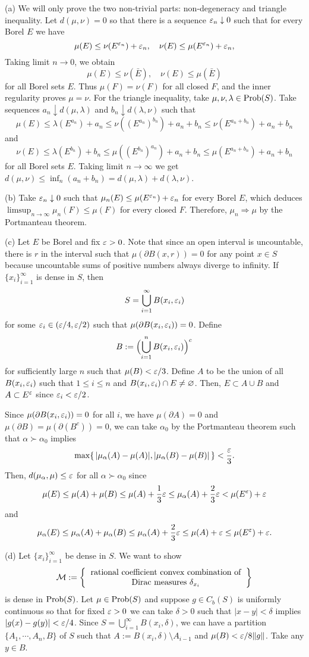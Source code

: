 \documentclass{../../small}
\begin{document}
\begin{pf}
(a)
We will only prove the two non-trivial parts: non-degeneracy and triangle inequality.
Let $d(\mu,\nu)=0$ so that there is a sequence $\varepsilon_n\downarrow0$ such that for every Borel $E$ we have
\[\mu(E)\le\nu(E^{\varepsilon_n})+\varepsilon_n,\quad\nu(E)\le\mu(E^{\varepsilon_n})+\varepsilon_n,\]
Taking limit $n\to0$, we obtain
\[\mu(E)\le\nu(\bar E),\quad\nu(E)\le\mu(\bar E)\]
for all Borel sets $E$.
Thus $\mu(F)=\nu(F)$ for all closed $F$, and the inner regularity proves $\mu=\nu$.
For the triangle inequality, take $\mu,\nu,\lambda\in\operatorname{Prob}(S)$.
Take sequences $a_n\downarrow d(\mu,\lambda)$ and $b_n\downarrow d(\lambda,\nu)$ such that
\[\mu(E)\le\lambda(E^{a_n})+a_n\le\nu((E^{a_n})^{b_n})+a_n+b_n\le\nu(E^{a_n+b_n})+a_n+b_n\]
and
\[\nu(E)\le\lambda(E^{b_n})+b_n\le\mu((E^{b_n})^{a_n})+a_n+b_n\le\mu(E^{a_n+b_n})+a_n+b_n\]
for all Borel sets $E$.
Taking limit $n\to\infty$ we get $d(\mu,\nu)\le\inf_n(a_n+b_n)=d(\mu,\lambda)+d(\lambda,\nu)$.

(b)
Take $\varepsilon_n\downarrow0$ such that $\mu_n(E)\le\mu(E^{\varepsilon_n})+\varepsilon_n$ for every Borel $E$, which deduces $\limsup_{n\to\infty}\mu_n(F)\le\mu(F)$ for every closed $F$.
Therefore, $\mu_n\Rightarrow\mu$ by the Portmanteau theorem.

(c)
Let $E$ be Borel and fix $\varepsilon>0$.
Note that since an open interval is uncountable, there is $r$ in the interval such that $\mu(\partial B(x,r))=0$ for any point $x\in S$ because uncountable sums of positive numbers always diverge to infinity.
If $\{x_i\}_{i=1}^\infty$ is dense in $S$, then
\[S=\bigcup_{i=1}^\infty B(x_i,\varepsilon_i)\]
for some $\varepsilon_i\in(\varepsilon/4,\varepsilon/2)$ such that $\mu(\partial B(x_i,\varepsilon_i))=0$.
Define
\[B:=\Bigl(\bigcup_{i=1}^nB(x_i,\varepsilon_i)\Bigr)^c\]
for sufficiently large $n$ such that $\mu(B)<\varepsilon/3$.
Define $A$ to be the union of all $B(x_i,\varepsilon_i)$ such that $1\le i\le n$ and $B(x_i,\varepsilon_i)\cap E\ne\varnothing$.
Then, $E\subset A\cup B$ and $A\subset E^\varepsilon$ since $\varepsilon_i<\varepsilon/2$.

Since $\mu(\partial B(x_i,\varepsilon_i))=0$ for all $i$, we have $\mu(\partial A)=0$ and $\mu(\partial B)=\mu(\partial(B^c))=0$, we can take $\alpha_0$ by the Portmanteau theorem such that $\alpha\succ\alpha_0$ implies
\[\max\{\,|\mu_\alpha(A)-\mu(A)|,|\mu_\alpha(B)-\mu(B)|\,\}<\frac{\varepsilon}3.\]
Then, $d(\mu_\alpha,\mu)\le\varepsilon$ for all $\alpha\succ\alpha_0$ since
\[\mu(E)\le\mu(A)+\mu(B)\le\mu(A)+\frac13\varepsilon\le\mu_\alpha(A)+\frac23\varepsilon<\mu(E^\varepsilon)+\varepsilon\]
and
\[\mu_\alpha(E)\le\mu_\alpha(A)+\mu_\alpha(B)\le\mu_\alpha(A)+\frac23\varepsilon\le\mu(A)+\varepsilon\le\mu(E^\varepsilon)+\varepsilon.\]

(d)
Let $\{x_i\}_{i=1}^\infty$ be dense in $S$.
We want to show
\[\cM:=\left\{\begin{tabular}{c}rational coefficient convex combination of\\Dirac measures $\delta_{x_i}$\end{tabular}\right\}\]
is dense in $\operatorname{Prob}(S)$.
Let $\mu\in\operatorname{Prob}(S)$ and suppose $g\in C_b(S)$ is uniformly continuous so that for fixed $\varepsilon>0$ we can take $\delta>0$ such that $|x-y|<\delta$ implies $|g(x)-g(y)|<\varepsilon/4$.
Since $S=\bigcup_{i=1}^\infty B(x_i,\delta)$, we can have a partition $\{A_1,\cdots,A_n,B\}$ of $S$ such that $A:=B(x_i,\delta)\setminus A_{i-1}$ and $\mu(B)<\varepsilon/8\|g\|$.
Take any $y\in B$.


\end{pf}
\end{document}
